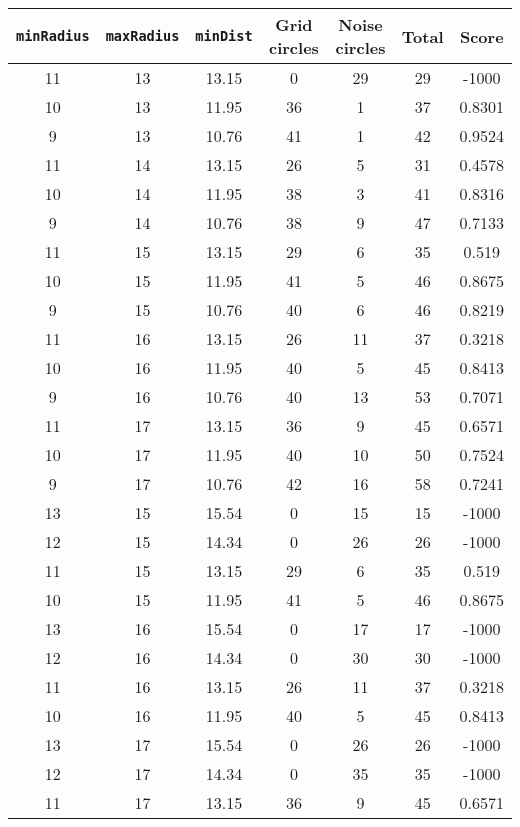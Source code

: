 \documentclass[letterpaper, 12pt]{article}
\begin{document}
\begin{longtable}{|c|c|c|c|c|c|c|}
\hline
\textbf{\texttt{minRadius}} & \textbf{\texttt{maxRadius}} & \textbf{\texttt{minDist}} & \textbf{Grid circles} & \textbf{Noise circles} & \textbf{Total} & \textbf{Score} \\
\hline
11 & 13 & 13.15 & 0 & 29 & 29 & -1000 \\
\hline
10 & 13 & 11.95 & 36 & 1 & 37 & 0.8301 \\
\hline
9 & 13 & 10.76 & 41 & 1 & 42 & 0.9524 \\
\hline
11 & 14 & 13.15 & 26 & 5 & 31 & 0.4578 \\
\hline
10 & 14 & 11.95 & 38 & 3 & 41 & 0.8316 \\
\hline
9 & 14 & 10.76 & 38 & 9 & 47 & 0.7133 \\
\hline
11 & 15 & 13.15 & 29 & 6 & 35 & 0.519 \\
\hline
10 & 15 & 11.95 & 41 & 5 & 46 & 0.8675 \\
\hline
9 & 15 & 10.76 & 40 & 6 & 46 & 0.8219 \\
\hline
11 & 16 & 13.15 & 26 & 11 & 37 & 0.3218 \\
\hline
10 & 16 & 11.95 & 40 & 5 & 45 & 0.8413 \\
\hline
9 & 16 & 10.76 & 40 & 13 & 53 & 0.7071 \\
\hline
11 & 17 & 13.15 & 36 & 9 & 45 & 0.6571 \\
\hline
10 & 17 & 11.95 & 40 & 10 & 50 & 0.7524 \\
\hline
9 & 17 & 10.76 & 42 & 16 & 58 & 0.7241 \\
\hline
13 & 15 & 15.54 & 0 & 15 & 15 & -1000 \\
\hline
12 & 15 & 14.34 & 0 & 26 & 26 & -1000 \\
\hline
11 & 15 & 13.15 & 29 & 6 & 35 & 0.519 \\
\hline
10 & 15 & 11.95 & 41 & 5 & 46 & 0.8675 \\
\hline
13 & 16 & 15.54 & 0 & 17 & 17 & -1000 \\
\hline
12 & 16 & 14.34 & 0 & 30 & 30 & -1000 \\
\hline
11 & 16 & 13.15 & 26 & 11 & 37 & 0.3218 \\
\hline
10 & 16 & 11.95 & 40 & 5 & 45 & 0.8413 \\
\hline
13 & 17 & 15.54 & 0 & 26 & 26 & -1000 \\
\hline
12 & 17 & 14.34 & 0 & 35 & 35 & -1000 \\
\hline
11 & 17 & 13.15 & 36 & 9 & 45 & 0.6571 \\
\hline

\end{longtable}
\end{document}
